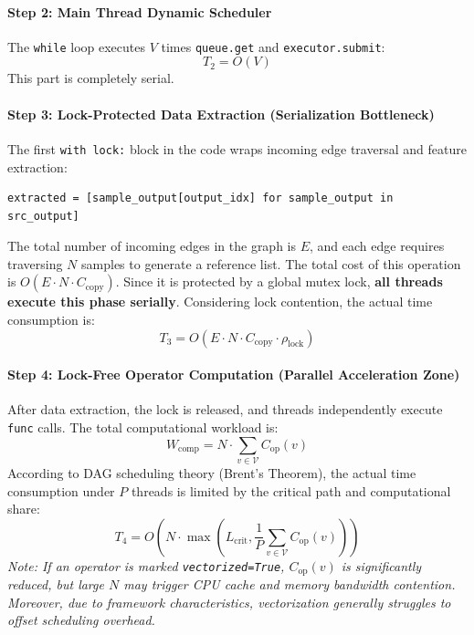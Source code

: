 \paragraph{Step 2: Main Thread Dynamic Scheduler}
The \texttt{while} loop executes $V$ times \texttt{queue.get} and \texttt{executor.submit}:
\begin{equation}
    T_2 = O(V)
\end{equation}
This part is completely serial.

\paragraph{Step 3: Lock-Protected Data Extraction (Serialization Bottleneck)}
The first \texttt{with lock:} block in the code wraps incoming edge traversal and feature extraction:
\begin{lstlisting}[style=plaincode]
extracted = [sample_output[output_idx] for sample_output in src_output]
\end{lstlisting}
The total number of incoming edges in the graph is $E$, and each edge requires traversing $N$ samples to generate a reference list. The total cost of this operation is $O(E \cdot N \cdot C_{\mathrm{copy}})$. Since it is protected by a global mutex lock, \textbf{all threads execute this phase serially}. Considering lock contention, the actual time consumption is:
\begin{equation}
    T_3 = O(E \cdot N \cdot C_{\mathrm{copy}} \cdot \rho_{\mathrm{lock}})
\end{equation}

\paragraph{Step 4: Lock-Free Operator Computation (Parallel Acceleration Zone)}
After data extraction, the lock is released, and threads independently execute \texttt{func} calls. The total computational workload is:
\begin{equation}
    W_{\mathrm{comp}} = N \cdot \sum_{v \in \mathcal{V}} C_{\mathrm{op}}(v)
\end{equation}
According to DAG scheduling theory (Brent's Theorem), the actual time consumption under $P$ threads is limited by the critical path and computational share:
\begin{equation}
    T_4 = O\left(N \cdot \max\left(L_{\mathrm{crit}}, \frac{1}{P} \sum_{v \in \mathcal{V}} C_{\mathrm{op}}(v)\right)\right)
\end{equation}
\textit{Note: If an operator is marked \texttt{vectorized=True}, $C_{\mathrm{op}}(v)$ is significantly reduced, but large $N$ may trigger CPU cache and memory bandwidth contention. Moreover, due to framework characteristics, vectorization generally struggles to offset scheduling overhead.}

